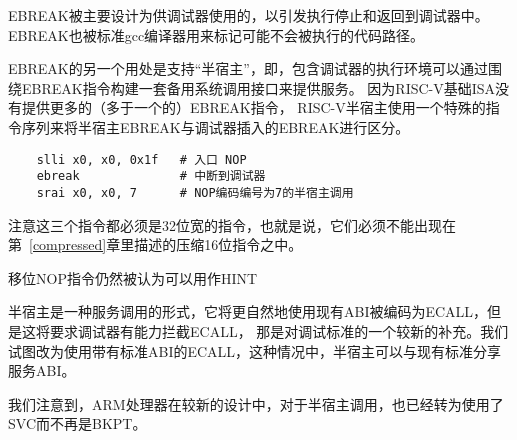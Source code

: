 \begin{commentary}
  EBREAK被主要设计为供调试器使用的，以引发执行停止和返回到调试器中。
  EBREAK也被标准gcc编译器用来标记可能不会被执行的代码路径。

  EBREAK的另一个用处是支持“半宿主”，即，包含调试器的执行环境可以通过围绕EBREAK指令构建一套备用系统调用接口来提供服务。
  因为RISC-V基础ISA没有提供更多的（多于一个的）EBREAK指令，
  RISC-V半宿主使用一个特殊的指令序列来将半宿主EBREAK与调试器插入的EBREAK进行区分。
\begin{verbatim}
    slli x0, x0, 0x1f   # 入口 NOP
    ebreak              # 中断到调试器
    srai x0, x0, 7      # NOP编码编号为7的半宿主调用
\end{verbatim}
  注意这三个指令都必须是32位宽的指令，也就是说，它们必须不能出现在第~\ref{compressed}章里描述的压缩16位指令之中。
  
   移位NOP指令仍然被认为可以用作HINT

   半宿主是一种服务调用的形式，它将更自然地使用现有ABI被编码为ECALL，但是这将要求调试器有能力拦截ECALL，
   那是对调试标准的一个较新的补充。我们试图改为使用带有标准ABI的ECALL，这种情况中，半宿主可以与现有标准分享服务ABI。
  
   我们注意到，ARM处理器在较新的设计中，对于半宿主调用，也已经转为使用了SVC而不再是BKPT。
\end{commentary}

